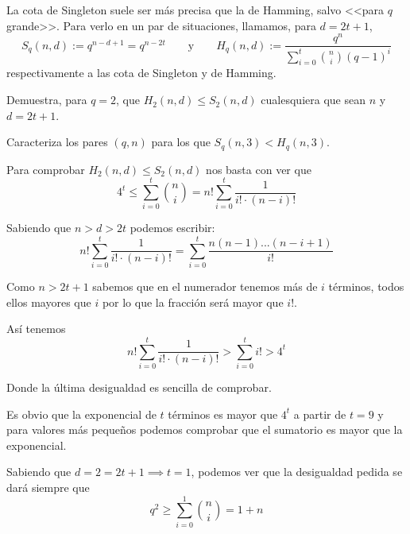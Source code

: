 \begin{problem}[10] La cota de Singleton suele ser más precisa que la de Hamming, salvo <<para $q$ grande>>. Para verlo en un par de situaciones, llamamos, para $d=2t+1$, $$S_q(n,d):=q^{n-d+1}=q^{n-2t}\qquad \text{y} \qquad H_q(n,d):=\frac{q^n}{\sum_{i=0}^t \binom{n}{i}(q-1)^i}$$ respectivamente a las cota de Singleton y de Hamming.

\ppart Demuestra, para $q=2$, que $H_2(n,d)\le S_2(n,d)$ cualesquiera que sean $n$ y $d=2t+1$.

\ppart Caracteriza los pares $(q,n)$ para los que $S_q(n,3)<H_q(n,3)$.

\solution


\spart

Para comprobar $H_2(n,d) \leq S_2(n,d)$ nos basta con ver que
\[4^{t} \leq \sum_{i=0}^t \binom{n}{i} = n! \sum_{i=0}^t\frac{1}{i!\cdot (n-i)!}\]

Sabiendo que $n>d > 2t$ podemos escribir:
\[ n! \sum_{i=0}^t\frac{1}{i!\cdot (n-i)!} =\sum_{i=0}^t\frac{n(n-1)...(n-i+1)}{i!}\]

Como $n>2t+1$ sabemos que en el numerador tenemos más de $i$ términos, todos ellos mayores que $i$ por lo que la fracción será mayor que $i!$.

Así tenemos
\[n! \sum_{i=0}^t\frac{1}{i!\cdot (n-i)!} > \sum_{i=0}^t i! > 4^t\]

Donde la última desigualdad es sencilla de comprobar.

Es obvio que la exponencial de $t$ términos es mayor que $4^t$ a partir de $t=9$ y para valores más pequeños podemos comprobar que el sumatorio es mayor que la exponencial.

\spart

Sabiendo que $d=2=2t+1 \implies t=1$, podemos ver que la desigualdad pedida se dará siempre que
\[q^{2} \geq \sum_{i=0}^1 \binom{n}{i} = 1 + n\]

\end{problem}

